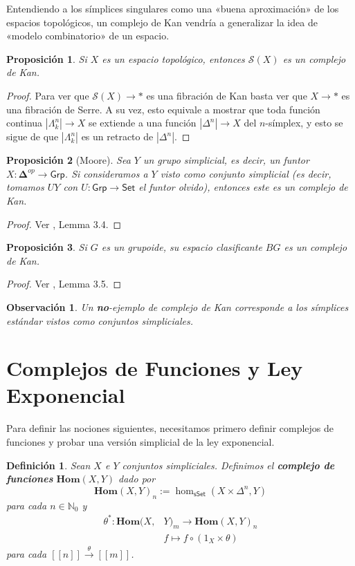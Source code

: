 \documentclass[11pt]{report}
\theoremstyle{colored}
\newtheorem{definition}{Definición}[section]
\newtheorem{proposition}{Proposición}[section]
\newtheorem{remark}{Observación}[section]
\newcommand{\N}{\mathbb{N}}
\newcommand{\nat}[1]{[\![#1]\!]}
\newcommand{\ord}[1]{\nat{#1}}
\newcommand{\cat}[1]{\mathsf{#1}}
\renewcommand{\ss}[1]{\Delta^{#1}}
\newcommand{\horn}[2]{\Lambda^{#1}_{#2}}
\newcommand{\ordcat}{\boldsymbol{\Delta}}
\newcommand{\homcomplex}{\mathbf{Hom}}
\newcommand{\guill}[1]{«#1»}
\begin{document}
Entendiendo a los símplices singulares como una \guill{buena aproximación} de los espacios topológicos, un complejo de Kan vendría a generalizar la idea de \guill{modelo combinatorio} de un espacio.

\begin{proposition} Si $X$ es un espacio topológico, entonces $\mathcal{S}(X)$ es un complejo de Kan. 
\end{proposition}
\begin{proof} Para ver que $\mathcal{S}(X) \to \ast$ es una fibración de Kan basta ver que $X \to \ast$ es una fibración de Serre. A su vez, esto equivale a mostrar que toda función continua $|\horn{n}{k}| \to X$ se extiende a una función $|\ss{n}| \to X$ del $n$-símplex, y esto se sigue de que $|\horn{n}{k}|$ es un retracto de $|\ss{n}|$.
\end{proof}

\begin{proposition}[Moore] Sea $Y$ un grupo simplicial, es decir, un funtor $X : \ordcat^{op} \to \cat{Grp}$. Si consideramos a $Y$ visto como conjunto simplicial (es decir, tomamos $UY$ con $U : \cat{Grp} \to \cat{Set}$ el funtor olvido), entonces este es un complejo de Kan.
\end{proposition}
\begin{proof} Ver \cite{GJ}, Lemma 3.4.
\end{proof}

\begin{proposition} Si $G$ es un grupoide, su espacio clasificante $BG$ es un complejo de Kan.
\end{proposition}
\begin{proof} Ver \cite{GJ}, Lemma 3.5. 
\end{proof}

\begin{remark} Un \textbf{no}-ejemplo de complejo de Kan corresponde a los símplices estándar vistos como conjuntos simpliciales. 
\end{remark}

\section{Complejos de Funciones y Ley Exponencial}

Para definir las nociones siguientes, necesitamos primero definir complejos de funciones y probar una versión simplicial de la ley exponencial.

\begin{definition} Sean $X$ e $Y$ conjuntos simpliciales. Definimos el \textbf{complejo de funciones} $\homcomplex(X,Y)$ dado por
\[
\homcomplex(X,Y)_n := \hom_{\cat{sSet}}(X \times \ss{n},Y)
\]
para cada $n \in \N_0$ y 
\begin{align*}
\theta^* : \homcomplex(X,&Y)_m \to \homcomplex(X,Y)_n \\
&f \longmapsto f \circ (1_X \times \theta)
\end{align*}
para cada $\ord{n} \xrightarrow{\theta} \ord{m}$.
\end{definition}
\end{document}
